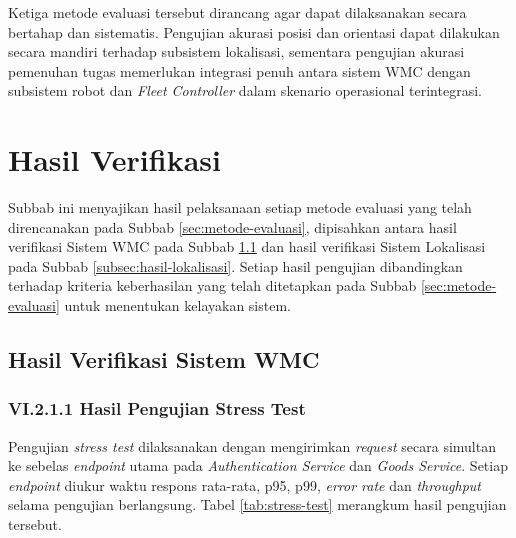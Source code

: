 Ketiga metode evaluasi tersebut dirancang agar dapat dilaksanakan secara bertahap dan sistematis. Pengujian akurasi posisi dan orientasi dapat dilakukan secara mandiri terhadap subsistem lokalisasi, sementara pengujian akurasi pemenuhan tugas memerlukan integrasi penuh antara sistem WMC dengan subsistem robot dan \textit{Fleet Controller} dalam skenario operasional terintegrasi.

\section{Hasil Verifikasi}
\label{sec:hasil-verifikasi}
Subbab ini menyajikan hasil pelaksanaan setiap metode evaluasi yang telah direncanakan pada Subbab \ref{sec:metode-evaluasi}, dipisahkan antara hasil verifikasi Sistem WMC pada Subbab \ref{subsec:hasil-wmc} dan hasil verifikasi Sistem Lokalisasi pada Subbab \ref{subsec:hasil-lokalisasi}. Setiap hasil pengujian dibandingkan terhadap kriteria keberhasilan yang telah ditetapkan pada Subbab \ref{sec:metode-evaluasi} untuk menentukan kelayakan sistem.

\subsection{Hasil Verifikasi Sistem WMC}
\label{subsec:hasil-wmc}

\subsubsection*{VI.2.1.1 Hasil Pengujian Stress Test}
Pengujian \textit{stress test} dilaksanakan dengan mengirimkan \textit{request} secara simultan ke sebelas \textit{endpoint} utama pada \textit{Authentication Service} dan \textit{Goods Service}. Setiap \textit{endpoint} diukur waktu respons rata-rata, p95, p99, \textit{error rate} dan \textit{throughput} selama pengujian berlangsung. Tabel \ref{tab:stress-test} merangkum hasil pengujian tersebut.

